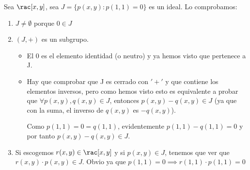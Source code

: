\begin{example} Sea $\rac[x,y]$, sea $J=\{p(x,y): p(1,1)=0\}$ es un ideal. Lo comprobamos:
\begin{enumerate}
	\item $J \neq \emptyset$ porque $0 \in J$
	\item $(J,+)$ es un subgrupo.
	\begin{itemize}
		\item El 0 es el elemento identidad (o neutro) y ya hemos visto que pertenece a J.
		\item Hay que comprobar que J es cerrado con $'+'$ y que contiene los elementos inversos, pero como hemos visto esto es equivalente a probar que $\forall p(x,y), q(x,y) \in J$, entonces $p(x,y)-q(x,y) \in J$ (ya que con la suma, el inverso de $q(x,y)$ es $-q(x,y)$).

		Como $p(1,1)=0=q(1,1)$, evidentemente $p(1,1)-q(1,1)=0$ y por tanto $p(x,y)-q(x,y) \in J$.
	\end{itemize}
	\item Si escogemos $r(x,y) \in \rac[x,y]$ y si $p(x,y) \in J$, tenemos que ver que $r(x,y)\cdot p(x,y) \in J$. Obvio ya que $p(1,1)=0 \implies r(1,1)\cdot p(1,1) = 0$
\end{enumerate}
\end{example}

